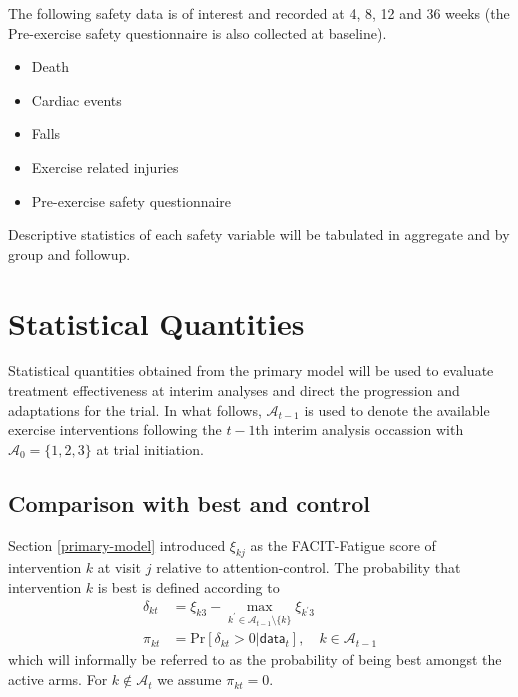 \documentclass[
]{article}
\begin{document}
The following safety data is of interest and recorded at 4, 8, 12 and 36 weeks (the Pre-exercise safety questionnaire is also collected at baseline).

\begin{itemize}
  \item Death
  \item Cardiac events
  \item Falls
  \item Exercise related injuries
  \item Pre-exercise safety questionnaire
\end{itemize}

Descriptive statistics of each safety variable will be tabulated in aggregate and by group and followup.


\clearpage


\hypertarget{statistical-quantities}{%
  \section{Statistical Quantities}\label{statistical-quantities}}

Statistical quantities obtained from the primary model will be used to evaluate treatment effectiveness at interim analyses and direct the progression and adaptations for the trial.
In what follows, $\mathcal{A}_{t-1}$ is used to denote the available exercise interventions following the $t-1$th interim analysis occassion with $\mathcal{A}_0=\{1,2,3\}$ at trial initiation.

\hypertarget{comparison-wth-best}{%
  \subsection{Comparison with best and control}\label{comparison-wth-best}}

Section \ref{primary-model} introduced $\xi_{kj}$ as the FACIT-Fatigue score of intervention $k$ at visit $j$ relative to attention-control.
The probability that intervention $k$ is best is defined according to
$$
  \begin{aligned}
    \delta_{kt} &= \xi_{k3} - \underset{k^\prime\in\mathcal{A}_{t-1}\setminus\{k\}}{\max}\xi_{k^\prime 3} \\
    \pi_{kt} & = \text{Pr}[\delta_{kt}>0|\mathsf{data}_t], \quad k \in \mathcal{A}_{t-1}
  \end{aligned}
$$
which will informally be referred to as the probability of being best amongst the active arms.
For $k\notin\mathcal{A}_t$ we assume $\pi_{kt}=0$.
\end{document}
